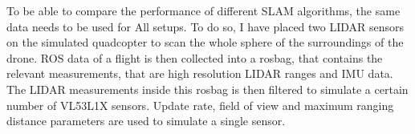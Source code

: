 To be able to compare the performance of different SLAM algorithms, the same data needs to be used for All
setups. To do so, I have placed two LIDAR sensors on the simulated quadcopter to scan the whole sphere of 
the surroundings of the drone. ROS data of a flight is then collected into a rosbag, that contains the 
relevant measurements, that are high resolution LIDAR ranges and IMU data. The LIDAR measurements inside 
this rosbag is then filtered to simulate a certain number of VL53L1X sensors. Update rate, field of view 
and maximum ranging distance parameters are used to simulate a single sensor.




\vfill
\selectthesislanguage

\setcounter{romanPage}{\value{page}}
